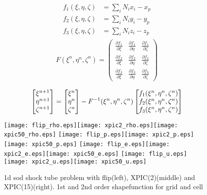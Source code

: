 \documentclass[11pt]{article}
\def\ddp#1_#2{\frac{\partial #1}{\partial #2}}
\begin{document}
\begin{enumerate}
\begin{align*}
f_1(\xi, \eta, \zeta) &= \sum_i N_i x_i - x_p \\
f_2(\xi, \eta, \zeta) &= \sum_i N_i y_i - y_p \\
f_3(\xi, \eta, \zeta) &= \sum_i N_i z_i - z_p 
\end{align*}
\begin{align*}
F(\xi^n,\eta^n, \zeta^n) = 
\begin{pmatrix}
\ddp{f_1}_{\xi} & \ddp{f_1}_{\eta}  &  \ddp{f_1}_{\zeta}\\
\ddp{f_2}_{\xi} & \ddp{f_2}_{\eta}  &  \ddp{f_2}_{\zeta}\\
\ddp{f_3}_{\xi} & \ddp{f_3}_{\eta}  &  \ddp{f_3}_{\zeta}
\end{pmatrix}\\
\end{align*}
\begin{align*}
\left[
\begin{array}{@{}c@{}}
\xi^{n+1} \\
\eta^{n+1} \\
\zeta^{n+1} \\
\end{array} 
\right] = 
\left[
\begin{array}{@{}c@{}}
\xi^{n} \\
\eta^{n} \\
\zeta^{n} \\
\end{array} 
\right] - F^{-1}(\xi^n,\eta^n, \zeta^n)
\left[
\begin{array}{@{}c@{}}
f_1(\xi^n,\eta^n, \zeta^n )\\
f_2(\xi^n,\eta^n, \zeta^n ) \\
f_3(\xi^n,\eta^n, \zeta^n ) \\
\end{array} 
\right]
\end{align*}

\end{enumerate}

\clearpage
{}
\begin{figure}[ht!]
	\begin{center}
		\texttt{[image: flip\_rho.eps]}\texttt{[image: xpic2\_rho.eps]}\texttt{[image: xpic50\_rho.eps]}
		\texttt{[image: flip\_p.eps]}\texttt{[image: xpic2\_p.eps]}\texttt{[image: xpic50\_p.eps]}
		\texttt{[image: flip\_e.eps]}\texttt{[image: xpic2\_e.eps]}\texttt{[image: xpic50\_e.eps]}
		\texttt{[image: flip\_u.eps]}\texttt{[image: xpic2\_u.eps]}\texttt{[image: xpic50\_u.eps]}
		\caption{1d sod shock tube problem with flip(left), XPIC(2)(middle) and XPIC(15)(right). 1st and 2nd order shapefunction for grid and cell}\label{fig:geo}
	\end{center}
\end{figure}
\end{document}
